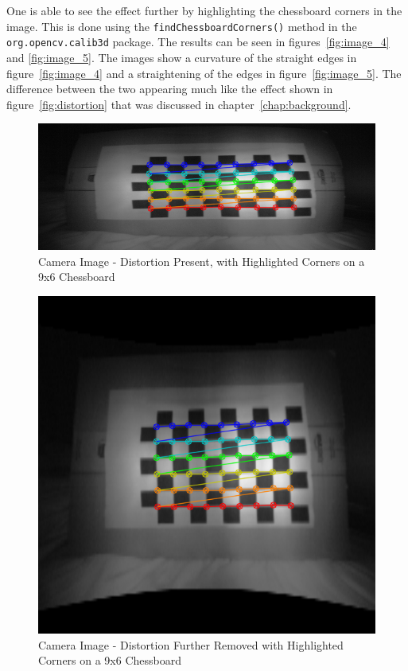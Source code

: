 \documentclass[11pt,oneside]{report}
\newcommand\code[1]{\texttt{#1}}
\begin{document}
		One is able to see the effect further by highlighting the chessboard corners in the image.
		This is done using the \code{findChessboardCorners()} method in the \code{org.opencv.calib3d} package.
		The results can be seen in figures~\ref{fig:image_4} and \ref{fig:image_5}.
		The images show a curvature of the straight edges in figure~\ref{fig:image_4} and a straightening of the edges in figure~\ref{fig:image_5}.
		The difference between the two appearing much like the effect shown in figure~\ref{fig:distortion} that was discussed in chapter~\ref{chap:background}.
		\begin{figure}
			\centering
    				\includegraphics[width=\textwidth]{4}
    				\caption{Camera Image - Distortion Present, with Highlighted Corners on a 9x6 Chessboard\protect {\label{fig:image_4}}}
    			
		\end{figure}	
		\begin{figure}
			\centering
    				\includegraphics[scale=0.5]{5}
    				\caption{Camera Image - Distortion Further Removed with Highlighted Corners on a 9x6 Chessboard\protect {\label{fig:image_5}}}
    			
		\end{figure}	
\end{document}
